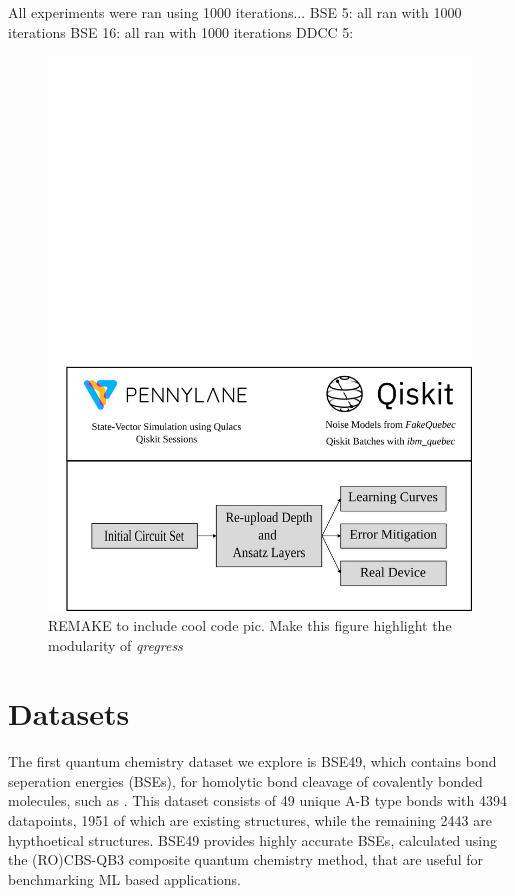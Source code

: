 \documentclass[journal=jacsat,manuscript=article]{achemso}
\begin{document}
All experiments were ran using 1000 iterations...
BSE 5: all ran with 1000 iterations
BSE 16: all ran with 1000 iterations
DDCC 5: 


\begin{figure}[H]
	\centering
	\includegraphics[width=\linewidth]{../images/manuscript_figures/overview.png}
	\caption{REMAKE to include cool code pic. Make this figure highlight the modularity of \textit{qregress}}
	\label{fig:overview_project}
\end{figure}







\section{Datasets}\label{subsection:datasets}

The first quantum chemistry dataset we explore is BSE49, which contains bond seperation energies (BSEs), for homolytic bond cleavage of covalently bonded molecules, such as .\cite{prasad_bse49_2021}
This dataset consists of 49 unique A-B type bonds with 4394 datapoints, 1951 of which are existing structures, while the remaining 2443 are hypthoetical structures. 
BSE49 provides highly accurate BSEs, calculated using the  (RO)CBS-QB3\cite{wood_restricted-open-shell_2006,montgomery_complete_1999,montgomery_complete_2000} composite quantum chemistry method, that are useful for benchmarking ML based applications.
\end{document}

